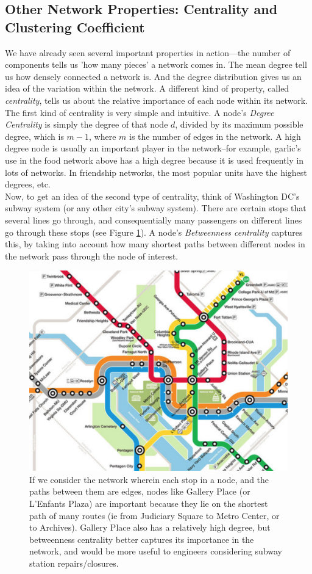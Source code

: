 \documentclass[12pt]{article}
\begin{document}
\subsection{Other Network Properties: Centrality and Clustering Coefficient}
We have already seen several important properties in action---the number of components tells us 'how many pieces' a network comes in. The mean degree tell us how densely connected a network is. And the degree distribution gives us an idea of the variation within the network. A different kind of property, called \emph{centrality}, tells us about the relative importance of each node within its network.\\
The first kind of centrality is very simple and intuitive. A node's \emph{Degree Centrality} is simply the degree of that node $d$, divided by  its maximum possible degree, which is $m-1$, where $m$ is the number of edges in the network. A high degree node is usually an important player in the network--for example, garlic's use in the food network above has a high degree because it is used frequently in lots of networks. In friendship networks, the most popular units have the highest degrees, etc.\\
Now, to get an idea of the second type of centrality, think of Washington DC's subway system (or any other city's subway system). There are certain stops that several lines go through, and consequentially many passengers on different lines go through these stops (see Figure \ref{subway}). A node's \emph{Betweenness centrality} captures this, by taking into account how many shortest paths between different nodes in the network pass through the node of interest. 
\begin{figure}[htbp]
\begin{center}
\includegraphics[width=.8\linewidth]{subway.png}
\caption{If we consider the network wherein each stop in a node, and the paths between them are edges, nodes like Gallery Place (or L'Enfants Plaza) are important because they lie on the shortest path of many routes (ie from Judiciary Square to Metro Center, or to Archives). Gallery Place also has a relatively high degree, but betweenness centrality better captures its importance in the network, and would be more useful to engineers considering subway station repairs/closures.}
\label{subway}
\end{center}
\end{figure}
\end{document}

